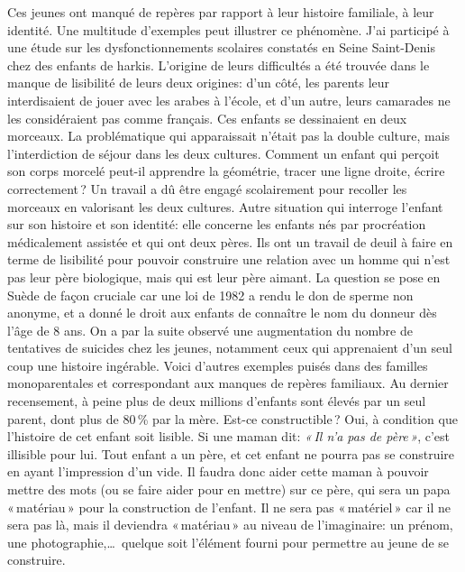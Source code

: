 \documentclass[11pt]{article} %
\begin{document}
  Ces jeunes ont manqué de repères par rapport à leur histoire familiale, à leur identité. Une multitude d'exemples peut illustrer ce phénomène.\newline
  J'ai participé à une étude sur les dysfonctionnements scolaires constatés en Seine Saint-Denis chez des enfants de harkis. L'origine de leurs difficultés a été trouvée dans le manque de lisibilité de leurs deux origines: d'un côté, les parents leur interdisaient de jouer avec les arabes à l'école, et d'un autre, leurs camarades ne les considéraient pas comme français. Ces enfants se dessinaient en deux morceaux. La problématique qui apparaissait n'était pas la double culture, mais l'interdiction de séjour dans les deux cultures. Comment un enfant qui perçoit son corps morcelé peut-il apprendre la géométrie, tracer une ligne droite, écrire correctement ? Un travail a dû être engagé scolairement pour recoller les morceaux en valorisant les deux cultures.\newline
  Autre situation qui interroge l'enfant sur son histoire et son identité: elle concerne les enfants nés par procréation médicalement assistée et qui ont deux pères. Ils ont un travail de deuil à faire en terme de lisibilité pour pouvoir construire une relation avec un homme qui n'est pas leur père biologique, mais qui est leur père aimant. La question se pose en Suède de façon cruciale car une loi de 1982 a rendu le don de sperme non anonyme, et a donné le droit aux enfants de connaître le nom du donneur dès l'âge de 8 ans. On a par la suite observé une augmentation du nombre de tentatives de suicides chez les jeunes, notamment ceux qui apprenaient d'un seul coup une histoire ingérable.\newline
  Voici d'autres exemples puisés dans des familles monoparentales et correspondant aux manques de repères familiaux. Au dernier recensement, à peine plus de deux millions d'enfants sont élevés par un seul parent, dont plus de 80\,\% par la mère. Est-ce constructible ? Oui, à condition que l'histoire de cet enfant soit lisible.\newline
  Si une maman dit: \textit{« Il n'a pas de père »}, c'est illisible pour lui. Tout enfant a un père, et cet enfant ne pourra pas se construire en ayant l'impression d'un vide. Il faudra donc aider cette maman à pouvoir mettre des mots (ou se faire aider pour en mettre) sur ce père, qui sera un papa « matériau » pour la construction de l'enfant. Il ne sera pas « matériel » car il ne sera pas là, mais il deviendra « matériau » au niveau de l'imaginaire: un prénom, une photographie,\dots\ quelque soit l'élément fourni pour permettre au jeune de se construire.\newline
\end{document}
